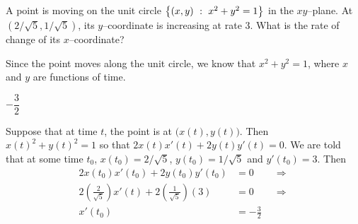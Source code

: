 \subsection*{\Procedural}


\begin{Mquestion}[2007H]\label{s3.2relationshipfirst}
 A point is moving on the unit circle
$\left\{ (x, y)~:~ x^2 + y^2 = 1 \right\}$ in the $xy$--plane.
At $(2/\sqrt{5}, 1/\sqrt{5})$, its $y$--coordinate is increasing at rate 3.
What is the rate of change of its $x$--coordinate?
\end{Mquestion}
\begin{hint}
Since the point moves along the unit circle, we know that $x^2+y^2=1$, where $x$ and $y$ are functions of time.
\end{hint}
\begin{answer}
$-\dfrac{3}{2}$
\end{answer}
\begin{solution}
 Suppose that at time $t$, the point is at $\big(x(t),y(t)\big)$.
Then $x(t)^2+y(t)^2=1$ so that $2x(t)x'(t)+2y(t)y'(t)=0$. We are told that
at some time $t_0$, $x(t_0)=2/\sqrt{5}$, $y(t_0)=1/\sqrt{5}$ and $y'(t_0)=3$.
Then
\begin{align*}
2x(t_0)x'(t_0)+2y(t_0)y'(t_0)&=0 \qquad \Rightarrow\\
2\left(\frac{2}{\sqrt{5}}\right)x'(t)+2\left(\frac{1}{\sqrt5}\right)(3)&=0
\qquad \Rightarrow\\
x'(t_0)&=-\frac{3}{2}
\end{align*}
\end{solution}


